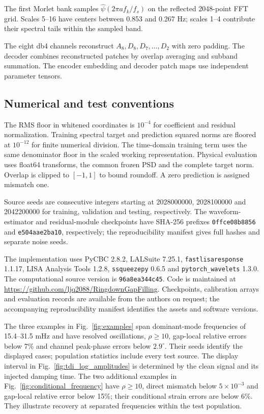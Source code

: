 \documentclass[10pt,prd,aps,a4paper,twocolumn,superscriptaddress,nofootinbib,floatfix]{revtex4-2}
\begin{document}
The first Morlet bank samples $\widehat\psi(2\pi a f_k/f_s)$ on the reflected 2048-point FFT grid. Scales 5--16 have centers between 0.853 and 0.267 Hz; scales 1--4 contribute their spectral tails within the sampled band.

The eight db4 channels reconstruct $A_8,D_8,D_7,\ldots,D_2$ with zero padding. The decoder combines reconstructed patches by overlap averaging and subband summation. The encoder embedding and decoder patch maps use independent parameter tensors.

\subsection{Numerical and test conventions}
The RMS floor in whitened coordinates is $10^{-4}$ for coefficient and residual normalization. Training spectral target and prediction squared norms are floored at $10^{-12}$ for finite numerical division. The time-domain training term uses the same denominator floor in the scaled working representation. Physical evaluation uses float64 transforms, the common frozen PSD and the complete target norm. Overlap is clipped to $[-1,1]$ to bound roundoff. A zero prediction is assigned mismatch one.

Source seeds are consecutive integers starting at 2028000000, 2028100000 and 2042200000 for training, validation and testing, respectively. The waveform-estimator and residual-module checkpoints have SHA-256 prefixes \texttt{0ffce08b8856} and \texttt{e504aae2ba10}, respectively; the reproducibility manifest gives full hashes and separate noise seeds.

The implementation uses PyCBC 2.8.2, LALSuite 7.25.1, \texttt{fastlisaresponse} 1.1.17, LISA Analysis Tools 1.2.8, \texttt{ssqueezepy} 0.6.5 and \texttt{pytorch\_wavelets} 1.3.0. The computational source version is \texttt{96a8ea344c45}. Code is maintained at \url{https://github.com/ljq2088/RingdownGapFilling}. Checkpoints, calibration arrays and evaluation records are available from the authors on request; the accompanying reproducibility manifest identifies the assets and software versions.

The three examples in Fig.~\ref{fig:examples} span dominant-mode frequencies of 15.4--31.5 mHz and have resolved oscillations, $\rho\ge10$, gap-local relative errors below 7\% and channel peak-phase errors below $2.9^\circ$. Their seeds identify the displayed cases; population statistics include every test source. The display interval in Fig.~\ref{fig:tdi_log_amplitudes} is determined by the clean signal and its injected damping time. The two additional examples in Fig.~\ref{fig:conditional_frequency} have $\rho\ge10$, direct mismatch below $5\times10^{-3}$ and gap-local relative error below 15\%; their conditional strain errors are below 6\%. They illustrate recovery at separated frequencies within the test population.
\end{document}
